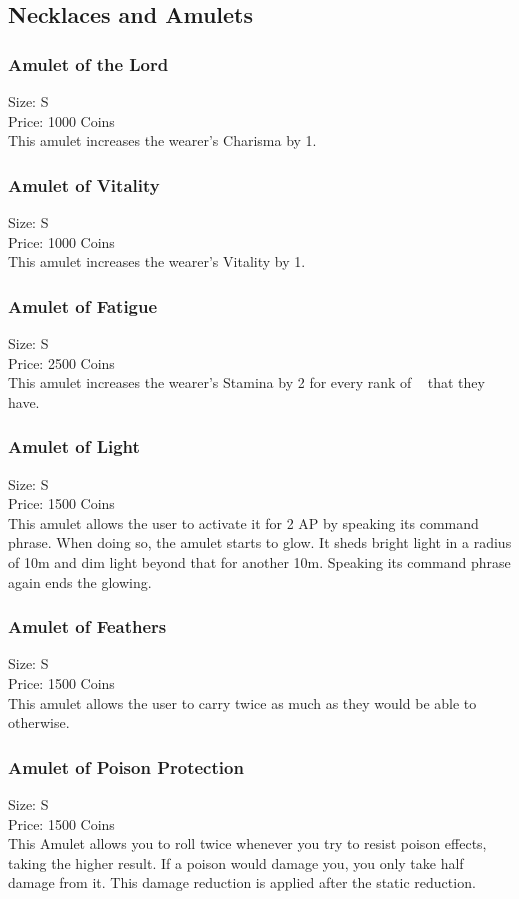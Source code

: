 \subsection{Necklaces and Amulets}\label{subsec:amulets}

\subsubsection{Amulet of the Lord}\label{item:amuletOfLord}
Size: S\\
Price: 1000 Coins\\
This amulet increases the wearer's Charisma by 1.

\subsubsection{Amulet of Vitality}\label{item:amuletOfVitality}
Size: S\\
Price: 1000 Coins\\
This amulet increases the wearer's Vitality by 1.

\subsubsection{Amulet of Fatigue}\label{item:amuletOfFatigue}
Size: S\\
Price: 2500 Coins\\
This amulet increases the wearer's Stamina by 2 for every rank of ~ that they have.

\subsubsection{Amulet of Light}\label{item:amuletOfLight}
Size: S\\
Price: 1500 Coins\\
This amulet allows the user to activate it for 2 AP by speaking its command phrase.
When doing so, the amulet starts to glow.
It sheds bright light in a radius of 10m and dim light beyond that for another 10m.
Speaking its command phrase again ends the glowing.

\subsubsection{Amulet of Feathers}\label{item:amuletOfFeathers}
Size: S\\
Price: 1500 Coins\\
This amulet allows the user to carry twice as much as they would be able to otherwise.

\subsubsection{Amulet of Poison Protection}\label{item:amuletOfAntidote}
Size: S\\
Price: 1500 Coins\\
This Amulet allows you to roll twice whenever you try to resist poison effects, taking the higher result.
If a poison would damage you, you only take half damage from it.
This damage reduction is applied after the static reduction.